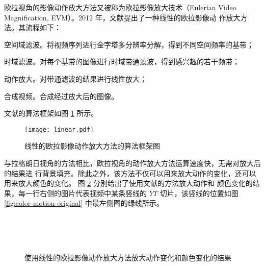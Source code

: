欧拉视角的影像动作放大方法又被称为欧拉影像放大技术（Eulerian Video
Magnification, EVM）。2012 年，文献\cite{wu2012eulerian}提出了一种线性的欧拉影像动
作放大方法。其流程如下：

\begin{compactenum}
\item 空间域滤波。将视频序列进行金字塔多分辨率分解，得到不同空间频率的基带；
\item 时域滤波。对每个基带的图像进行时域带通滤波，得到感兴趣的若干频带；
\item 动作放大。对带通滤波的结果进行线性放大；
\item 合成视频。合成经过放大后的图像。
\end{compactenum}

文献\cite{wu2012eulerian}的算法框架如图 \ref{fig:linear} 所示。

\begin{figure}[htbp]
  \centering
  \texttt{[image: linear.pdf]}
  \caption{线性的欧拉影像动作放大方法的算法框架图}
  \label{fig:linear}
\end{figure}

与拉格朗日视角的方法相比，欧拉视角的动作放大方法运算速度快，无需对放大后的结果进
行背景填充。除此之外，该方法不仅可以用来放大动作的变化，还可以用来放大颜色的变化。
图 \ref{fig:color-motion} 分別给出了使用文献\cite{wu2012eulerian}的方法放大动作和
颜色变化的结果，每一行右侧的图片代表视频中某条竖线的 $YT$ 切片，该竖线的位置如图
\ref{fig:color-motion-original} 中最左侧图的绿线所示。

\begin{figure}[htbp]
  \centering
    \\
    \\
    \\
  \caption{使用线性的欧拉影像动作放大方法放大动作变化和颜色变化的结果}
  \label{fig:color-motion}
\end{figure}

